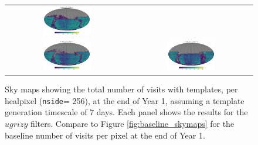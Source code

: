 \documentclass[preprintm,linenumbers]{aastex631}
\newcommand{\nside}{\texttt{nside}\xspace}
\begin{document}
\begin{figure}
\begin{tabular}{c c}
				\includegraphics[width=0.4\textwidth]{results/skymaps/skymap_first_year_one_snap_v4_0_10yrs_db_noDD_noTwi_tscale-7_nside-256_doAllTemplateMetrics_reduceCount_i_noDD_noTwi.pdf} \\
				\includegraphics[width=0.4\textwidth]{results/skymaps/skymap_first_year_one_snap_v4_0_10yrs_db_noDD_noTwi_tscale-7_nside-256_doAllTemplateMetrics_reduceCount_z_noDD_noTwi.pdf} &
				\includegraphics[width=0.4\textwidth]{results/skymaps/skymap_first_year_one_snap_v4_0_10yrs_db_noDD_noTwi_tscale-7_nside-256_doAllTemplateMetrics_reduceCount_y_noDD_noTwi.pdf} \\
			\end{tabular}
			\caption{Sky maps showing the total number of visits with templates, per healpixel (\nside = 256), at the end of Year 1, assuming a template generation timescale of 7 days. Each panel shows the results for the $ugrizy$ filters.
				Compare to Figure \ref{fig:baseline_skymaps} for the baseline number of visits per pixel at the end of Year 1.
			}
			\label{fig:template_skymaps_tscale-7}
		\end{figure}
\end{document}
